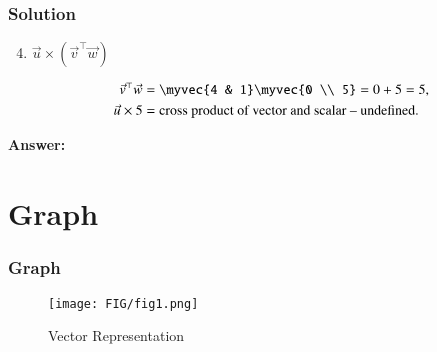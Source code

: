 \documentclass{beamer}
\numberwithin{equation}{section}
\begin{document}
\begin{frame}[fragile]
    \frametitle{Solution}
\begin{enumerate}[label=\alph*) ]
\setcounter{enumi}{3} 
 

  \begin{align*}
  (\vec{u}^\top \vec{v}) \vec{w} &= 11 \times \myvec{0 \\ 5} = \myvec{0 \\ 55}.
  \end{align*}
  
  This is meaningful scalar multiplication.

  \item \( \vec{u} \times (\vec{v}^\top \vec{w}) \)
  
  \begin{align*}
  \vec{v}^\top \vec{w} &= \myvec{4 & 1} \myvec{0 \\ 5} = 0 + 5 = 5,
  \\
  \vec{u} \times 5 &= \text{cross product of vector and scalar -- undefined}.
  \end{align*}

\end{enumerate}

\textbf{Answer:}

\end{frame}
\section{Graph}
\begin{frame}
    \frametitle{Graph}
    \begin{figure}[htbp]
    \centering
    \texttt{[image: FIG/fig1.png]}
    \caption{Vector Representation}
    \label{fig:FIG/fig1.png}
\end{figure}
\end{frame}
\end{document}
